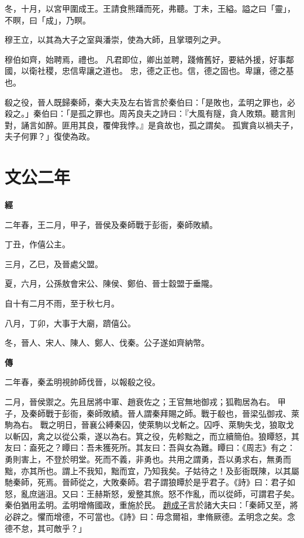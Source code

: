 \documentclass{ctexart}
\begin{document}
冬，十月，以宮甲圍成王。王請食熊蹯而死，弗聽。丁未，王縊。謚之曰「靈」，不瞑，曰「成」，乃瞑。

穆王立，以其為大子之室與潘崇，使為大師，且掌環列之尹。

穆伯如齊，始聘焉，禮也。
凡君即位，卿出並聘，踐脩舊好，要結外援，好事鄰國，以衛社稷，忠信卑讓之道也。
忠，德之正也。信，德之固也。卑讓，德之基也。

殽之役，晉人既歸秦師，秦大夫及左右皆言於秦伯曰：「是敗也，孟明之罪也，必殺之。」秦伯曰：「是孤之罪也。周芮良夫之詩曰：『大風有隧，貪人敗類。聽言則對，誦言如醉。匪用其良，覆俾我悖。』是貪故也，孤之謂矣。
孤實貪以禍夫子，夫子何罪？」復使為政。





\section{文公二年}


\textbf{經}



二年春，王二月，甲子，晉侯及秦師戰于彭衙，秦師敗績。

丁丑，作僖公主。

三月，乙巳，及晉處父盟。

夏，六月，公孫敖會宋公、陳侯、鄭伯、晉士縠盟于垂隴。

自十有二月不雨，至于秋七月。

八月，丁卯，大事于大廟，躋僖公。

冬，晉人、宋人、陳人、鄭人、伐秦。公子遂如齊納幣。

\textbf{傳}



二年春，秦孟明視帥師伐晉，以報殽之役。

二月，晉侯禦之。先且居將中軍、趙衰佐之；王官無地御戎；狐鞫居為右。
甲子，及秦師戰于彭衙，秦師敗績。晉人謂秦拜賜之師。戰于殽也，晉梁弘御戎、萊駒為右。
戰之明日，晉襄公縛秦囚，使萊駒以戈斬之。囚呼、萊駒失戈，狼取戈以斬囚，禽之以從公乘，遂以為右。箕之役，先軫黜之，而立續簡伯。狼瞫怒，其友曰：盍死之？瞫曰：吾未獲死所。其友曰：吾與女為難。瞫曰：《周志》有之：勇則害上，不登於明堂。死而不義，非勇也。共用之謂勇，吾以勇求右，無勇而黜，亦其所也。謂上不我知，黜而宜，乃知我矣。子姑待之！及彭衙既陳，以其屬馳秦師，死焉。晉師從之，大敗秦師。君子謂狼瞫於是乎君子。《詩》曰：君子如怒，亂庶遄沮。又曰：王赫斯怒，爰整其旅。怒不作亂，而以從師，可謂君子矣。秦伯猶用孟明。孟明增脩國政，重施於民。
\underline{趙成子}言於諸大夫曰：「秦師又至，將必辟之。懼而增德，不可當也。《詩》曰：毋念爾祖，聿脩厥德。孟明念之矣。念德不怠，其可敵乎？」
\end{document}
